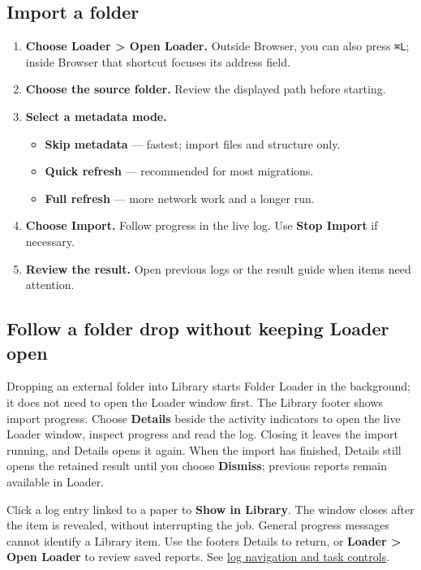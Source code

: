 \documentclass[10pt,letterpaper,oneside]{scrreprt}
\providecommand{\tightlist}{\setlength{\itemsep}{1pt}\setlength{\parskip}{0pt}}
\begin{document}
\subsection{Import a folder}\label{import-a-folder}

\begin{enumerate}
\tightlist
\item
  \textbf{Choose \textbf{Loader \textgreater{} Open Loader}.} Outside Browser, you can also press \texttt{{\symbolfont ⌘}}\texttt{L}; inside Browser that shortcut focuses its address field.
\item
  \textbf{Choose the source folder.} Review the displayed path before starting.
\item
  \textbf{Select a metadata mode.}

  \begin{itemize}
  \tightlist
  \item
    \textbf{Skip metadata} --- fastest; import files and structure only.
  \item
    \textbf{Quick refresh} --- recommended for most migrations.
  \item
    \textbf{Full refresh} --- more network work and a longer run.
  \end{itemize}
\item
  \textbf{Choose \textbf{Import}.} Follow progress in the live log. Use \textbf{Stop Import} if necessary.
\item
  \textbf{Review the result.} Open previous logs or the result guide when items need attention.
\end{enumerate}

\subsection{Follow a folder drop without keeping Loader open}\label{follow-a-folder-drop-without-keeping-loader-open}

Dropping an external folder into Library starts Folder Loader in the background; it does not need to open the Loader window first. The Library footer shows import progress. Choose \textbf{Details} beside the activity indicators to open the live Loader window, inspect progress and read the log. Closing it leaves the import running, and Details opens it again. When the import has finished, Details still opens the retained result until you choose \textbf{Dismiss}; previous reports remain available in Loader.

Click a log entry linked to a paper to \textbf{Show in Library}. The window closes after the item is revealed, without interrupting the job. General progress messages cannot identify a Library item. Use the footer\textquotesingle s Details to return, or \textbf{Loader \textgreater{} Open Loader} to review saved reports. See \hyperref[loader-maintenance]{log navigation and task controls}.
\end{document}
